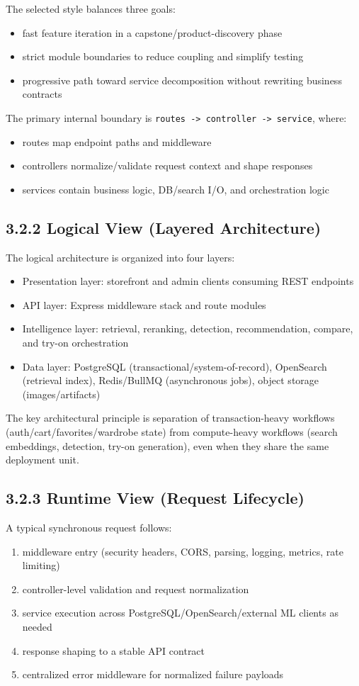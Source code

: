 \documentclass[12pt,a4paper]{report}
\begin{document}
The selected style balances three goals:
\begin{itemize}
\item fast feature iteration in a capstone/product-discovery phase
\item strict module boundaries to reduce coupling and simplify testing
\item progressive path toward service decomposition without rewriting business contracts
\end{itemize}

The primary internal boundary is \texttt{routes -> controller -> service}, where:
\begin{itemize}
\item routes map endpoint paths and middleware
\item controllers normalize/validate request context and shape responses
\item services contain business logic, DB/search I/O, and orchestration logic
\end{itemize}

\subsection{3.2.2 Logical View (Layered Architecture)}
The logical architecture is organized into four layers:
\begin{itemize}
\item Presentation layer: storefront and admin clients consuming REST endpoints
\item API layer: Express middleware stack and route modules
\item Intelligence layer: retrieval, reranking, detection, recommendation, compare, and try-on orchestration
\item Data layer: PostgreSQL (transactional/system-of-record), OpenSearch (retrieval index), Redis/BullMQ (asynchronous jobs), object storage (images/artifacts)
\end{itemize}

The key architectural principle is separation of transaction-heavy workflows (auth/cart/favorites/wardrobe state) from compute-heavy workflows (search embeddings, detection, try-on generation), even when they share the same deployment unit.

\subsection{3.2.3 Runtime View (Request Lifecycle)}
A typical synchronous request follows:
\begin{enumerate}
\item middleware entry (security headers, CORS, parsing, logging, metrics, rate limiting)
\item controller-level validation and request normalization
\item service execution across PostgreSQL/OpenSearch/external ML clients as needed
\item response shaping to a stable API contract
\item centralized error middleware for normalized failure payloads
\end{enumerate}
\end{document}
